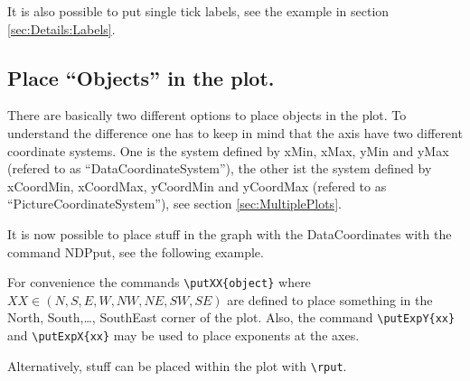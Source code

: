 It is also possible to put single tick labels, see the example in section
\ref{sec:Details:Labels}.

\subsection{Place ``Objects'' in the plot.}\label{sec:PlaceObjects}

There are basically two different options to place objects in the plot. To
understand the difference one has to keep in mind that the axis have two
different coordinate systems. One is the system defined by xMin, xMax, yMin and
yMax (refered to as ``DataCoordinateSystem''), the other ist the system defined
by xCoordMin, xCoordMax, yCoordMin and yCoordMax (refered to as
``PictureCoordinateSystem''), see section \ref{sec:MultiplePlots}.

It is now possible to place stuff in the graph with the DataCoordinates with the
command NDPput, see the following example.

\begin{minipage}[T]{0.45\linewidth}
	
\end{minipage}
\hspace{0.05\linewidth}
\begin{minipage}[T]{0.45\linewidth}
	
\end{minipage}


For convenience the commands \verb|\putXX{object}| where
$XX\in\left(N,S,E,W,NW,NE,SW,SE\right)$ are defined to place something in the
North, South,\ldots, SouthEast corner of the plot. Also, the command
\verb|\putExpY{xx}| and \verb|\putExpX{xx}| may be used to place exponents at
the axes.

\begin{minipage}[T]{0.45\linewidth}
	
\end{minipage}
\hspace{0.05\linewidth}
\begin{minipage}[T]{0.45\linewidth}
	
\end{minipage}

Alternatively, stuff can be placed
within the plot with \verb|\rput|.


\begin{minipage}[T]{0.5\linewidth}
	
\end{minipage}
\begin{minipage}[T]{0.5\linewidth}
	
\end{minipage}


